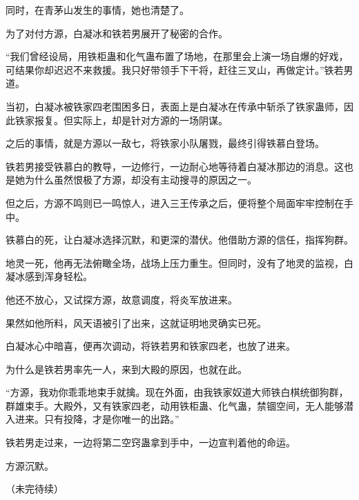 \begin{this_body}
同时，在青茅山发生的事情，她也清楚了。

为了对付方源，白凝冰和铁若男展开了秘密的合作。

“我们曾经设局，用铁柜蛊和化气蛊布置了场地，在那里会上演一场自爆的好戏，可结果你却迟迟不来救援。我只好带领手下干将，赶往三叉山，再做定计。”铁若男道。

当初，白凝冰被铁家四老围困多日，表面上是白凝冰在传承中斩杀了铁家蛊师，因此铁家报复。但实际上，却是针对方源的一场阴谋。

之后的事情，就是方源以一敌七，将铁家小队屠戮，最终引得铁慕白登场。

铁若男接受铁慕白的教导，一边修行，一边耐心地等待着白凝冰那边的消息。这也是她为什么虽然恨极了方源，却没有主动搜寻的原因之一。

但之后，方源不鸣则已一鸣惊人，进入三王传承之后，便将整个局面牢牢控制在手中。

铁慕白的死，让白凝冰选择沉默，和更深的潜伏。他借助方源的信任，指挥狗群。

地灵一死，他再无法俯瞰全场，战场上压力重生。但同时，没有了地灵的监视，白凝冰感到浑身轻松。

他还不放心，又试探方源，故意调度，将炎军放进来。

果然如他所料，风天语被引了出来，这就证明地灵确实已死。

白凝冰心中暗喜，便再次调动，将铁若男和铁家四老，也放了进来。

为什么是铁若男率先一人，来到大殿的原因，也就在此。

“方源，我劝你乖乖地束手就擒。现在外面，由我铁家奴道大师铁白棋统御狗群，群雄束手。大殿外，又有铁家四老，动用铁柜蛊、化气蛊，禁锢空间，无人能够潜入进来。只有投降，才是你唯一的出路。”

铁若男走过来，一边将第二空窍蛊拿到手中，一边宣判着他的命运。

方源沉默。

（未完待续）

\end{this_body}

